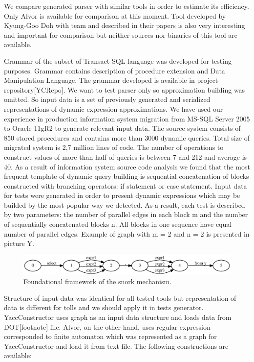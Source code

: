 \documentclass{sigplanconf}
\begin{document}
We compare generated parser with similar tools in order to estimate its efficiency. Only Alvor is available for comparison at this moment. Tool developed by Kyung-Goo Doh with team and described in their papers is also very interesting and important for comparison but neither sources nor binaries of this tool are available.

Grammar of the subset of Transact SQL language was developed for  testing purposes. Grammar contains description of procedure extension and Data Manipulation Language. The grammar developed is available in project repository[YCRepo]. We want to test parser only so approximation building was omitted. So input data is a set of previously generated and serialized representations of dynamic expression approximations. We have used our experience in production information system migration  from MS-SQL Server 2005 to Oracle 11gR2 to generate relevant input data. The source system consists of 850 stored procedures and contains more than 3000 dynamic queries. Total size of migrated system is 2,7 million lines of code. The number of operations to construct values of more than half of queries is between 7 and 212 and average is 40. As a result of information system source code analysis we found that the most frequent template of dynamic query building is sequential concatenation of blocks constructed with branching operators: if statement or case statement. Input data for tests were generated in order to present dynamic expressions which may be builded by the most popular way we detected. As a result, each test is described by two parameters: the number of parallel edges in each block m and the number of sequentially concatenated blocks n. All blocks in one sequence have equal number of parallel edges. Example of graph with m = 2 and n = 2 is presented in picture Y.

\begin{figure}
    \begin{center}
        \includegraphics[scale=0.5]{Graphs/x_10.eps}
    \end{center}
    \caption{Foundational framework of the snork mechanism.}
    \label{fig-ffsm}
\end{figure}

Structure of input data was identical for all tested tools but representation of data is different for tolls and we should apply it in tests generator. YaccConstructor uses graph as an input data structure and loads data from DOT[footnote] file. Alvor, on the other hand, uses regular expression corresponded to finite automaton which was represented as a graph for YaccConstructor and load it from text file. The following constructions are available:
\end{document}
